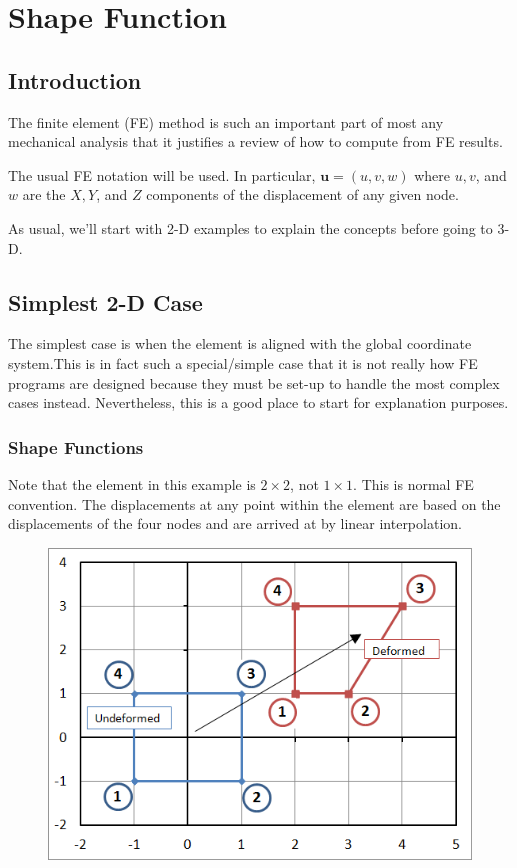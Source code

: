 

\chapter{Shape Function}

\section{Introduction}
The finite element (FE) method is such an important part of most any mechanical analysis that it justifies a review of how to compute from FE results.

The usual FE notation will be used.  In particular, $ \mathbf{u} = (u,v,w) $ where $ u, v $, and $ w $ are the $ X, Y $, and $ Z $ components of the displacement of any given node.

As usual, we'll start with 2-D examples to explain the concepts before going to 3-D.

\section{Simplest 2-D Case}
The simplest case is when the element is aligned with the global coordinate system.This is in fact such a special/simple case that it is not really how FE programs are designed because they must be set-up to handle the most complex cases instead. Nevertheless, this is a good place to start for explanation purposes.

\subsection{Shape Functions}
Note that the element in this example is $ 2 \times 2 $, not $ 1 \times 1 $.  This is normal FE convention.  The displacements at any point within the element are based on the displacements of the four nodes and are arrived at by linear interpolation.

\begin{figure}[h]
\centering
\includegraphics[width=0.7\linewidth]{figure/FE_mapping_example}
\caption{}
\label{fig:FE_mapping_example}
\end{figure}

